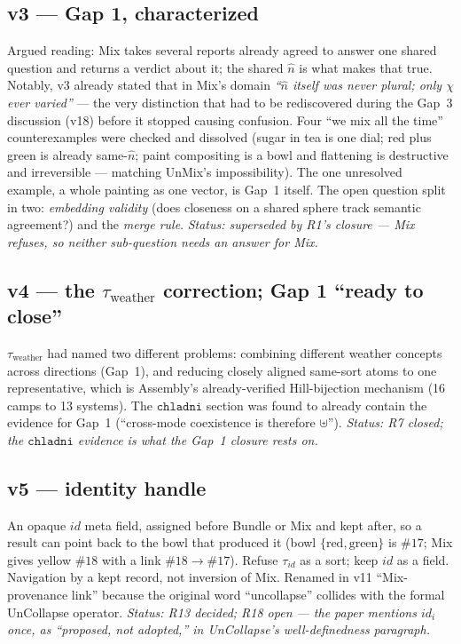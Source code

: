 \documentclass[11pt]{article}
\begin{document}
\subsection*{v3 --- Gap 1, characterized}
Argued reading: Mix takes several reports already agreed to answer
one shared question and returns a verdict about it; the shared
$\hat n$ is what makes that true. Notably, v3 already stated that in
Mix's domain \emph{``$\hat n$ itself was never plural; only $\chi$
ever varied''} --- the very distinction that had to be rediscovered
during the Gap~3 discussion (v18) before it stopped causing
confusion. Four ``we mix all the time'' counterexamples were checked
and dissolved (sugar in tea is one dial; red plus green is already
same-$\hat n$; paint compositing is a bowl and flattening is
destructive and irreversible --- matching UnMix's impossibility). The
one unresolved example, a whole painting as one vector, is Gap~1
itself. The open question split in two: \emph{embedding validity}
(does closeness on a shared sphere track semantic agreement?) and the
\emph{merge rule}. \emph{Status: superseded by R1's closure --- Mix
refuses, so neither sub-question needs an answer for Mix.}

\subsection*{v4 --- the $\tau_{\text{weather}}$ correction; Gap 1 ``ready to close''}
$\tau_{\text{weather}}$ had named two different problems: combining
different weather concepts across directions (Gap~1), and reducing
closely aligned same-sort atoms to one representative, which is
Assembly's already-verified Hill-bijection mechanism (16 camps to
13 systems). The $\mathtt{chladni}$ section was found to already
contain the evidence for Gap~1 (``cross-mode coexistence is
therefore $\uplus$''). \emph{Status: R7 closed; the $\mathtt{chladni}$
evidence is what the Gap~1 closure rests on.}

\subsection*{v5 --- identity handle}
An opaque $id$ meta field, assigned before Bundle or Mix and kept
after, so a result can point back to the bowl that produced it
(bowl $\{\text{red},\text{green}\}$ is $\#17$; Mix gives yellow
$\#18$ with a link $\#18\to\#17$). Refuse $\tau_{id}$ as a sort; keep
$id$ as a field. Navigation by a kept record, not inversion of Mix.
Renamed in v11 ``Mix-provenance link'' because the original word
``uncollapse'' collides with the formal UnCollapse operator.
\emph{Status: R13 decided; R18 open --- the paper mentions $id_i$
once, as ``proposed, not adopted,'' in UnCollapse's well-definedness
paragraph.}
\end{document}
